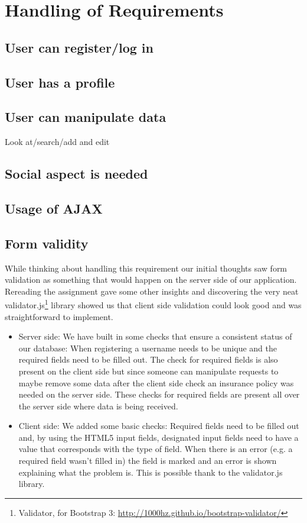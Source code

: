 \documentclass{article}
\begin{document}
\section{Handling of Requirements}
\subsection{User can register/log in}

\subsection{User has a profile}

\subsection{User can manipulate data}
Look at/search/add and edit

\subsection{Social aspect is needed}

\subsection{Usage of AJAX}

\subsection{Form validity}
While thinking about handling this requirement our initial thoughts saw form validation as something that would happen on the server side of our application. Rereading the assignment gave some other insights and discovering the very neat validator.js\footnote{Validator, for Bootstrap 3: \url{http://1000hz.github.io/bootstrap-validator/} } library showed us that client side validation could look good and was straightforward to implement.
\begin{itemize}
	\item Server side: We have built in some checks that ensure a consistent status of our database: When registering a username needs to be unique and the required fields need to be filled out. The check for required fields is also present on the client side but since someone can manipulate requests to maybe remove some data after the client side check an insurance policy was needed on the server side. These checks for required fields are present all over the server side where data is being received.
	\item Client side: We added some basic checks: Required fields need to be filled out and, by using the HTML5 input fields, designated input fields need to have a value that corresponds with the type of field. When there is an error (e.g. a required field wasn't filled in) the field is marked and an error is shown explaining what the problem is. This is possible thank to the validator.js library.
\end{itemize}
\end{document}
